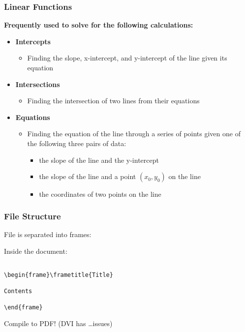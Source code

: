 \documentclass{beamer}
\begin{document}
\begin{frame}[fragile]\frametitle{Linear Functions}
\begin{center}\textbf{Frequently used to solve for the following calculations:} \end{center}

\vfill
\begin{itemize}
  \item \textbf{Intercepts}
  \begin{itemize}
    \item Finding the slope, x-intercept, and y-intercept of the line given its equation
  \end{itemize}
  \item \textbf{Intersections}
  \begin{itemize}
    \item Finding the intersection of two lines from their equations
  \end{itemize}
  \item \textbf{Equations}
  \begin{itemize}
       \item Finding the equation of the line through a series of points given one of the following three pairs of data:
       \begin{itemize}
        \item the slope of the line and the y-intercept
        \item the slope of the line and a point $(x_0,y_0)$ on the line
        \item the coordinates of two points on the line
       \end{itemize}
  \end{itemize}

\end{itemize}

\end{frame}


\begin{frame}[fragile]\frametitle{File Structure}

File is separated into frames: %

\vfill

Inside the document:

\vfill
\begin{verbatim}

\begin{frame}\frametitle{Title}

Contents 

\end{frame} \end{verbatim}

\vfill

Compile to PDF! (DVI has \ldots issues)

\vfill


\end{frame}
\end{document}
